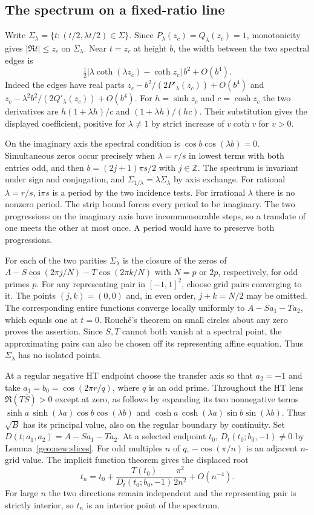 \documentclass[11pt]{article}
\numberwithin{equation}{section}
\theoremstyle{definition}
\newcommand{\Z}{\mathbb Z}
\newcommand{\ii}{\mathrm i}
\begin{document}
\subsection{The spectrum on a fixed-ratio line}\label{sec:slice-spectrum}

Write $\Sigma_\lambda=\{t:(t/2,\lambda t/2)\in\Sigma\}$. Since
$P_\lambda(z_c)=Q_\lambda(z_c)=1$, monotonicity gives
$|\Re t|\le z_c$ on $\Sigma_\lambda$. Near $t=z_c$ at height $b$,
the width between the two spectral edges is
\[
 \tfrac12|\lambda\coth(\lambda z_c)-\coth z_c|\, b^2+O(b^4).
\]
Indeed the edges have real parts $z_c-b^2/(2P'_\lambda(z_c))+O(b^4)$
and $z_c-\lambda^2 b^2/(2Q'_\lambda(z_c))+O(b^4)$.
For $h=\sinh z_c$ and $c=\cosh z_c$ the two derivatives are
$h(1+\lambda h)/c$ and $(1+\lambda h)/(hc)$. Their substitution
gives the displayed coefficient, positive for $\lambda\ne1$ by
strict increase of $v\coth v$ for $v>0$.

On the imaginary axis the spectral condition is
$\cos b\cos(\lambda b)=0$. Simultaneous zeros occur precisely when
$\lambda=r/s$ in lowest terms with both entries odd, and then
$b=(2j+1)\pi s/2$ with $j\in\Z$. The spectrum is invariant under
sign and conjugation, and $\Sigma_{1/\lambda}=\lambda\Sigma_\lambda$
by axis exchange. For rational $\lambda=r/s$, $\ii\pi s$ is a
period by the two incidence tests. For irrational $\lambda$ there
is no nonzero period. The strip bound forces every period to be
imaginary. The two progressions on the imaginary axis have
incommensurable steps, so a translate of one meets the other at
most once. A period would have to preserve both progressions.

For each of the two parities $\Sigma_\lambda$ is the closure of the
zeros of $A-S\cos(2\pi j/N)-T\cos(2\pi k/N)$ with $N=p$ or
$2p$, respectively, for odd primes $p$. For any representing
pair in $[-1,1]^2$, choose grid pairs converging to it. The points
$(j,k)=(0,0)$ and, in even order, $j+k=N/2$ may be omitted.
The corresponding entire functions converge locally uniformly to
$A-Sa_1-Ta_2$, which equals one at $t=0$. Rouch\'e's theorem on
small circles about any zero proves the assertion. Since $S,T$
cannot both vanish at a spectral point, the approximating pairs can
also be chosen off its representing affine equation. Thus
$\Sigma_\lambda$ has no isolated points.

At a regular negative HT endpoint choose the transfer axis so that
$a_2=-1$ and take $a_1=b_0=\cos(2\pi r/q)$, where $q$ is an odd
prime. Throughout the HT lens $\Re(T\overline S)>0$ except at zero,
as follows by expanding its two nonnegative terms
$\sinh a\,\sinh(\lambda a)\cos b\cos(\lambda b)$ and
$\cosh a\,\cosh(\lambda a)\sin b\sin(\lambda b)$. Thus $\sqrt B$
has its principal value, also on the regular boundary by continuity.
Set $D(t;a_1,a_2)=A-Sa_1-Ta_2$. At a selected endpoint $t_0$,
$D_t(t_0;b_0,-1)\ne0$ by Lemma~\ref{geo:new:slices}.
For odd multiples $n$ of $q$, $-\cos(\pi/n)$ is an adjacent
$n$-grid value. The implicit function theorem gives the displaced root
\[
 t_n=t_0+\frac{T(t_0)}{D_t(t_0;b_0,-1)}
                  \frac{\pi^2}{2n^2}+O(n^{-4}).
\]
For large $n$ the two directions remain independent and the representing
pair is strictly interior, so $t_n$ is an interior point of the spectrum.
\end{document}
